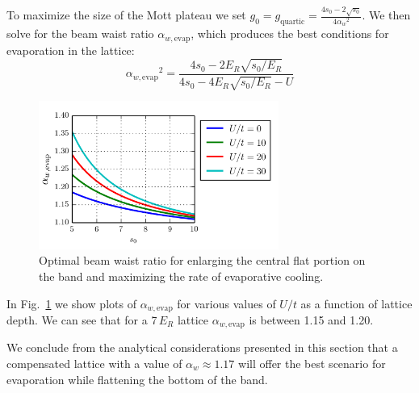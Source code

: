 \documentclass[11pt,letter]{article}
\newcommand{\awaist}{\ensuremath{ \alpha_{w} }}
\newcommand{\awaistevap}{\ensuremath{ \alpha_{w,\text{evap}} }}
\begin{document}
To maximize the size of the Mott plateau we set $g_{0} = g_{\text{quartic}} =
\frac{  4 s_{0} - 2 \sqrt{s_{0}} }{ 4 \awaist^{2} } $.   We then solve for
the beam waist ratio $\awaistevap$, which produces the best conditions for
evaporation in the lattice: 
\begin{equation}
 \awaistevap^{2} =  \frac{ 4 s_{0} - 2 E_{R} \sqrt{s_{0}/E_{R} }}
    { 4s_{0} - 4 E_{R} \sqrt{s_{0}/E_{R}}  - U }  
\end{equation} 
\begin{figure}
    \centering
\includegraphics[width=0.7\textwidth]{figures/alpha-evap-optimal.png}
\caption{Optimal beam waist ratio for enlarging the central flat portion on
the band and maximizing the rate of evaporative cooling. }
\label{fig:alpha-evap-optimal}
\end{figure}
In Fig.~\ref{fig:alpha-evap-optimal} we show plots of $\awaistevap$ for various
values of $U/t$ as a function of lattice depth.  We can see that for a
7\,$E_{R}$ lattice $\awaistevap$ is between 1.15 and 1.20.  

We conclude from the analytical considerations presented in this section
that a compensated lattice with a value of $\awaist \approx 1.17 $ will offer
the best scenario for evaporation while flattening the bottom of the band.  


\end{document}
